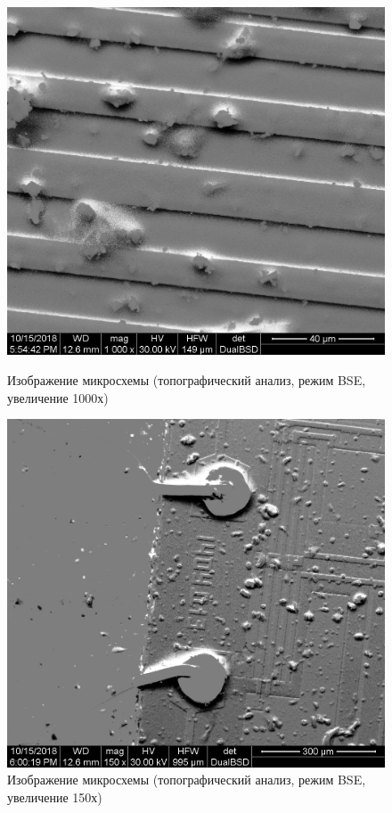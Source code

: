 \documentclass[a4paper]{article}
\begin{document}
\begin{enumerate}
    \begin{figure}[h]
\begin{center}
\begin{minipage}[h]{0.45\linewidth}
\includegraphics[width=1\linewidth]{topo1mikoch_005.jpg}
\caption{Изображение микросхемы (топографический анализ, режим BSE, увеличение 1000х)} %
\end{minipage}
\hfill 
\begin{minipage}[h]{0.45\linewidth}
\includegraphics[width=1\linewidth]{topo1mikoch_008.jpg}
\caption{Изображение микросхемы (топографический анализ, режим BSE, увеличение 150х)}
\label{ris:experimcoded}
\end{minipage}
\end{center}
\end{figure}


\end{enumerate}
\end{document}
